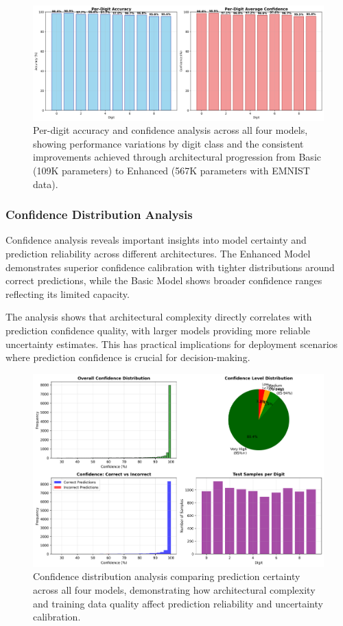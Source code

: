 \documentclass[11pt,a4paper]{report}
\begin{document}
\begin{figure}[H]
\centering
\includegraphics[width=\textwidth]{per_digit_performance.png}
\caption{Per-digit accuracy and confidence analysis across all four models, showing performance variations by digit class and the consistent improvements achieved through architectural progression from Basic (109K parameters) to Enhanced (567K parameters with EMNIST data).}
\label{fig:digit_per_digit}
\end{figure}

\subsubsection{Confidence Distribution Analysis}

Confidence analysis reveals important insights into model certainty and prediction reliability across different architectures. The Enhanced Model demonstrates superior confidence calibration with tighter distributions around correct predictions, while the Basic Model shows broader confidence ranges reflecting its limited capacity.

The analysis shows that architectural complexity directly correlates with prediction confidence quality, with larger models providing more reliable uncertainty estimates. This has practical implications for deployment scenarios where prediction confidence is crucial for decision-making.

\begin{figure}[H]
\centering
\includegraphics[width=\textwidth]{confidence_analysis.png}
\caption{Confidence distribution analysis comparing prediction certainty across all four models, demonstrating how architectural complexity and training data quality affect prediction reliability and uncertainty calibration.}
\label{fig:confidence_analysis}
\end{figure}
\end{document}
